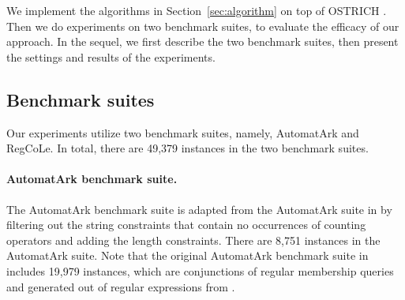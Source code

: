 %

We implement the algorithms in Section~\ref{sec:algorithm} on top of OSTRICH \cite{ostrich,atva2020}. Then we do experiments on two benchmark suites, to evaluate the efficacy of our approach.  In the sequel, we first describe the two benchmark suites, then present the settings and results of the experiments. 


\subsection{Benchmark suites}

Our experiments utilize two benchmark suites, namely, AutomatArk and RegCoLe. In total, there are 49,379 instances in the two benchmark suites.

\paragraph*{AutomatArk benchmark suite.}
The AutomatArk benchmark suite is adapted from the AutomatArk suite in \cite{z3str3re} by filtering out the string constraints that contain no occurrences of counting operators and adding the length constraints. There are 8,751 instances in the AutomatArk suite.
Note that the original AutomatArk benchmark suite in \cite{z3str3re}  includes 19,979 instances, which are conjunctions of regular membership queries and generated out of regular expressions from \cite{automatark}. 

